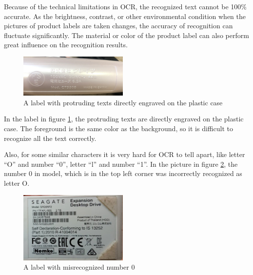 \documentclass[technicalreport]{ieicej}
\begin{document}
        Because of the technical limitations in OCR, the recognized text cannot be 100\% accurate. As the brightness, contrast, or other environmental condition when the pictures of product labels are taken changes, the accuracy of recognition can fluctuate significantly. The material or color of the product label can also perform great influence on the recognition results.
        
        \begin{figure}[t] 
            \begin{center}
            \includegraphics[width=0.48\textwidth]{figure/plastic.png}
            \end{center}
            \caption{A label with protruding texts directly engraved on the plastic case}
            \label{fig:plastic}
        \end{figure}

        In the label in figure \ref{fig:plastic}, the protruding texts are directly engraved on the plastic case. The foreground is the same color as the background, so it is difficult to recognize all the text correctly.
        
        Also, for some similar characters it is very hard for OCR to tell apart, like letter “O” and number “0”, letter “l” and number “1”. In the picture in figure \ref{fig:letter-number}, the number 0 in model, which is in the top left corner was incorrectly recognized as letter O. 
        
        \begin{figure}[t] 
            \begin{center}
            \includegraphics[width=0.48\textwidth]{figure/letter-number.png}
            \end{center}
            \caption{A label with misrecognized number 0}
            \label{fig:letter-number}
        \end{figure}
\end{document}
